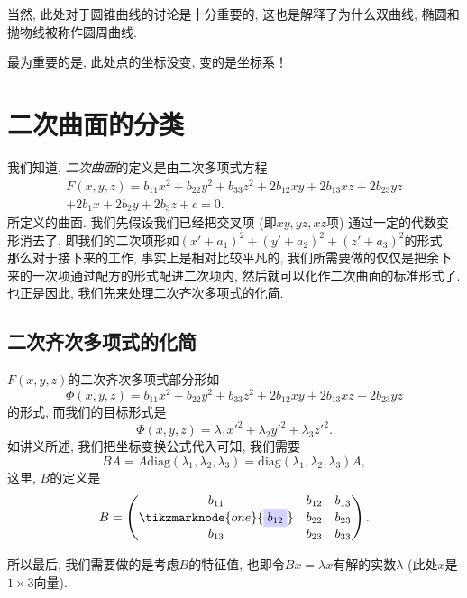 \documentclass[./main.tex]{subfiles}
\begin{document}
当然, 此处对于圆锥曲线的讨论是十分重要的, 这也是解释了为什么双曲线, 椭圆和抛物线被称作圆周曲线. 

最为重要的是, 此处点的坐标没变, 变的是坐标系！
\section{二次曲面的分类}

我们知道, \textit{二次曲面}的定义是由二次多项式方程
\begin{multline*}
    F(x,y,z)=b_{11}x^2+b_{22}y^2+b_{33}z^2+2b_{12}xy+
2b_{13}xz+2b_{23}yz\\
+2b_1x+2b_2y+2b_3z+c=0.
\end{multline*}
所定义的曲面. 我们先假设我们已经把交叉项 (即$xy,yz,xz$项) 通过一定的代数变形消去了, 
即我们的二次项形如$(x'+a_1)^2+(y'+a_2)^2+(z'+a_3)^2$的形式. 
那么对于接下来的工作, 事实上是相对比较平凡的, 我们所需要做的仅仅是把余下来的一次项通过配方的形式配进二次项内, 然后就可以化作二次曲面的标准形式了. 也正是因此, 我们先来处理二次齐次多项式的化简. 
\subsection{二次齐次多项式的化简}
$F(x,y,z)$的二次齐次多项式部分形如
\begin{equation*}
\Phi(x,y,z)=b_{11}x^2+b_{22}y^2+b_{33}z^2+2b_{12}xy+
2b_{13}xz+2b_{23}yz
\end{equation*}
的形式, 而我们的目标形式是
\begin{equation}\label{标准形式}
\Phi(x,y,z)=\lambda_1x'^2+\lambda_2y'^2+\lambda_3z'^2.
\end{equation}
如讲义所述, 我们把坐标变换公式代入可知, 我们需要
\[
BA=A\text{diag}(\lambda_1,\lambda_2,\lambda_3)=\text{diag}(\lambda_1,\lambda_2,\lambda_3)A,
\]
这里, $B$的定义是
\[B=
\begin{pmatrix}
b_{11}&b_{12}&b_{13}\\
\tikzmarknode{one}{\highlight{blue}{b_{12}}}&b_{22}&b_{23}\\
b_{13}&b_{23}&b_{33}\\
\end{pmatrix}.
\]
所以最后, 我们需要做的是考虑$B$的特征值, 也即令$Bx=\lambda x$有解的实数$\lambda$ (此处$x$是$1\times3$向量).
\end{document}
